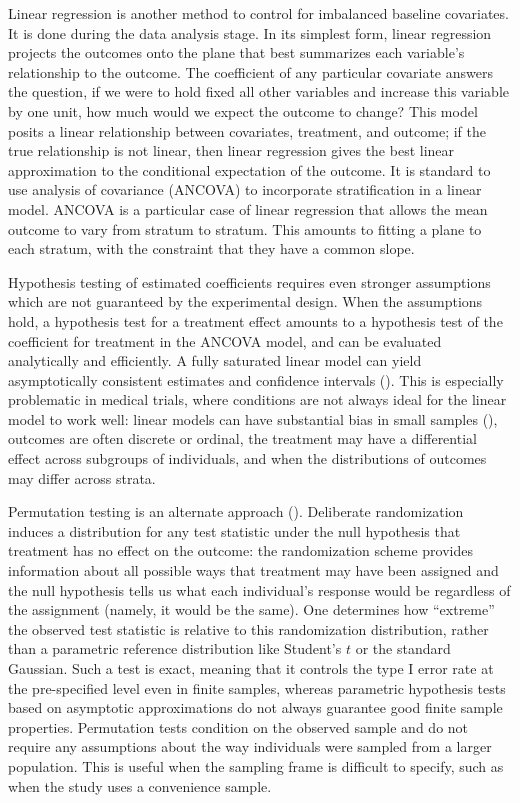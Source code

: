 \documentclass[12pt]{article}
\begin{document}
Linear regression is another method to control for imbalanced baseline covariates.
It is done during the data analysis stage.
In its simplest form, linear regression projects the outcomes onto the plane that best summarizes each variable's relationship to the outcome.
The coefficient of any particular covariate answers the question, if we were to hold fixed all other variables and increase this variable by one unit, how much would we expect the outcome to change?
This model posits a linear relationship between covariates, treatment, and outcome; 
if the true relationship is not linear, then linear regression gives the best linear approximation to the conditional expectation of the outcome.
It is standard to use analysis of covariance (ANCOVA) to incorporate stratification in a linear model.
ANCOVA is a particular case of linear regression that allows the mean outcome to vary from stratum to stratum.
This amounts to fitting a plane to each stratum, with the constraint that they have a common slope.

Hypothesis testing of estimated coefficients requires even stronger assumptions which are not guaranteed by the experimental design.
When the assumptions hold, a hypothesis test for a treatment effect amounts to a hypothesis test of the coefficient for treatment in the ANCOVA model, and can be evaluated analytically and efficiently.
A fully saturated linear model can yield asymptotically consistent estimates and confidence intervals (\cite{lin_agnostic_2013}).
This is especially problematic in medical trials, where conditions are not always ideal for the linear model to work well:
linear models can have substantial bias in small samples (\cite{freedman_regression_2008}),
outcomes are often discrete or ordinal, 
the treatment may have a differential effect across subgroups of individuals, 
and when the distributions of outcomes may differ across strata.

Permutation testing is an alternate approach (\cite{fisher_design_1935, pitman_significance_1937,pitman_significance_1938}).
Deliberate randomization induces a distribution for any test statistic under the null hypothesis that treatment has no effect on the outcome:
the randomization scheme provides information about all possible ways that treatment may have been assigned 
and the null hypothesis tells us what each individual's response would be regardless of the assignment (namely, it would be the same).
One determines how ``extreme'' the observed test statistic is relative to this randomization distribution, rather than a parametric reference distribution like Student's $t$ or the standard Gaussian.
Such a test is exact, meaning that it controls the type I error rate at the pre-specified level even in finite samples, whereas parametric hypothesis tests based on asymptotic approximations do not always guarantee good finite sample properties.
Permutation tests condition on the observed sample and do not require any assumptions about the way individuals were sampled from a larger population.
This is useful when the sampling frame is difficult to specify, such as when the study uses a convenience sample.
\end{document}
